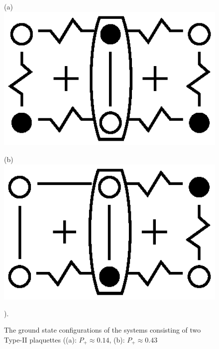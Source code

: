\documentclass[preprint,12pt]{elsarticle}
\begin{document}
	\begin{figure}[H]
		\centering
		\begin{minipage}{0.2\textwidth}
			\centering
			(a)
			\includegraphics[width=1\textwidth]{pictures/Type2_3x2.eps}
			\label{fig:Type2_3x2}
		\end{minipage}
		\hspace{20pt}
		\begin{minipage}{0.2\textwidth}
			\centering
			(b)
			\includegraphics[width=1\textwidth]{pictures/Type2_3x2_2.eps}
			\label{fig:Type2_3x2_2}
		\end{minipage}
		\caption{The ground state configurations of the systems consisting of two Type-II plaquettes ((a): $P_+\approx0.14$, (b): $P_+\approx0.43$}).
		\label{fig:Type2_32}
	\end{figure}
	
\end{document}
